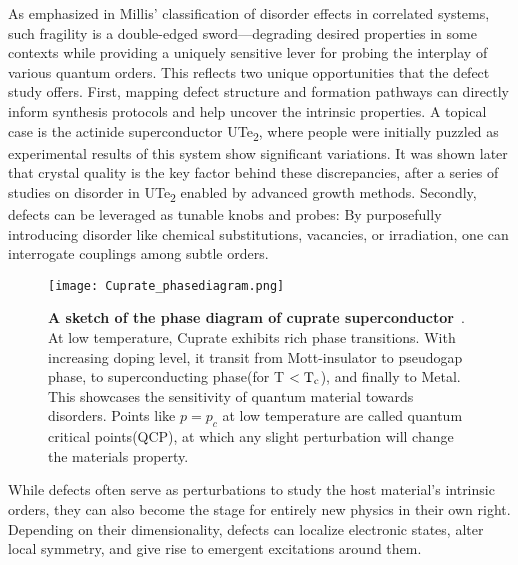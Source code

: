 As emphasized in Millis’ classification of disorder effects in correlated systems\cite{millisClassificationEffectsDisorder2003}, such fragility is a double-edged sword—degrading desired properties in some contexts while providing a uniquely sensitive lever for probing the interplay of various quantum orders. This reflects two unique opportunities that the defect study offers. First, mapping defect structure and formation pathways can directly inform synthesis protocols and help uncover the intrinsic properties. A topical case is the actinide superconductor UTe\textsubscript{2}, where people were initially puzzled as experimental results of this system show significant variations. It was shown later that crystal quality is the key factor behind these discrepancies, after a series of studies on disorder in UTe\textsubscript{2} enabled by advanced growth methods\cite{aishwaryaMeltingChargeDensity2024}\cite{xueAdvancesSingleCrystal2025}. Secondly, defects can be leveraged as tunable knobs and probes: By purposefully introducing disorder like chemical substitutions, vacancies, or irradiation, one can interrogate couplings among subtle orders\cite{fradkinIntertwinedOrdersPhysics2025}\cite{ohDisentanglingIntertwinedOrders2025}.   

\begin{figure} 
	\centering
	\texttt{[image: Cuprate\_phasediagram.png]}
	\caption[\textbf{A sketch of the phase diagram of cuprate superconductor}]{\textbf{A sketch of the phase diagram of cuprate superconductor}~\cite{tailleferScatteringPairingCuprate2010}. At low temperature, Cuprate exhibits rich phase transitions. With increasing doping level, it transit from Mott-insulator to pseudogap phase, to superconducting phase(for T $< \text{T}\textsubscript{c}$), and finally to Metal. This showcases the sensitivity of quantum material towards disorders. Points like $p=p_c$ at low temperature are called quantum critical points(QCP), at which any slight perturbation will change the materials property.}
	\label{fig:cuprate_pd}
\end{figure}

While defects often serve as perturbations to study the host material’s intrinsic orders, they can also become the stage for entirely new physics in their own right. Depending on their dimensionality, defects can localize electronic states, alter local symmetry, and give rise to emergent excitations around them.

